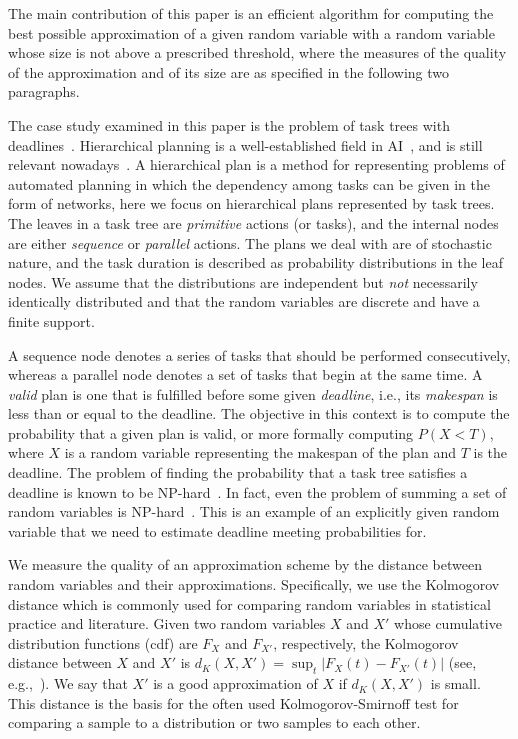 \documentclass[letterpaper]{article} %
\begin{document}
The main contribution of this paper is an efficient algorithm for computing the best possible approximation of a given random variable with a random variable whose size is not above a prescribed threshold, where the measures of the quality of the approximation and of its size are as specified in the following two paragraphs. 

The case study examined in this paper is the problem of task trees with deadlines~\cite{cohen2015estimating,CohenGW18}. Hierarchical planning is a well-established field in AI~\cite{thomas1988hierarchical,erol1994htn,erol1996complexity}, and is still relevant nowadays~\cite{alford2016hierarchical,xiao2017hierarchical}. A hierarchical plan is a method for representing problems of automated planning in which the dependency among tasks can be given in the form of networks, here we focus on hierarchical plans represented by task trees. The leaves in a task tree are \emph{primitive} actions (or tasks), and the internal nodes are either \emph{sequence} or \emph{parallel} actions. The plans we deal with are of stochastic nature, and the task duration is described as probability distributions in the leaf nodes. We assume that the distributions are independent but {\em not} necessarily identically distributed and that the random variables are discrete and have a finite support. 

A sequence node denotes a series of tasks that should be performed consecutively, whereas a parallel node denotes a set of tasks that begin at the same time. A \emph{valid} plan is one that is fulfilled before some given \emph{deadline}, i.e., its \emph{makespan} is less than or equal to the deadline. The objective in this context is to compute the probability that a given plan is valid, or more formally computing $P(X<T)$, where $X$ is a random variable representing the makespan of the plan and $T$ is the deadline. The problem of finding the probability that a task tree satisfies a deadline is known to be NP-hard~\cite{mohring2001scheduling}. In fact, even the problem of summing a set of random variables is NP-hard~\cite{mohring2001scheduling}. This is an example of an explicitly given random variable that we need to estimate deadline meeting probabilities for.

We measure the quality of an approximation scheme by the distance between random variables and their approximations. Specifically, we use the Kolmogorov distance which is  commonly used for comparing random variables in statistical practice and literature. Given two random variables $X$ and $X'$ whose cumulative distribution functions (cdf) are $F_X$ and $F_{X'}$, respectively, the Kolmogorov distance between $X$ and $X'$ is $d_K(X,X')= \sup_t |F_X(t) - F_{X'}(t)|$ (see, e.g.,~\cite{gibbons2011nonparametric}). We say that $X'$ is a good approximation of $X$ if $d_K(X,X')$ is small. This distance is the basis for the often used Kolmogorov-Smirnoff test for comparing a sample to a distribution or two samples to each other. 
\end{document}
